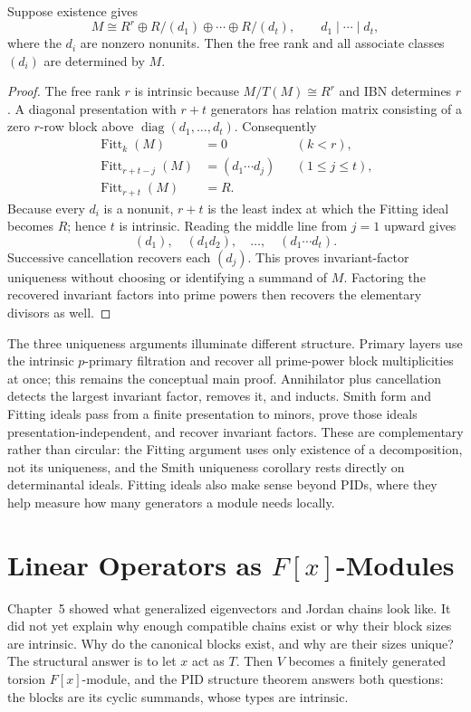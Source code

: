\begin{theorem}
\label{thm:fitting-invariant-factors}
Suppose existence gives
\[
M\cong R^r\oplus R/(d_1)\oplus\cdots\oplus R/(d_t),
\qquad d_1\mid\cdots\mid d_t,
\]
where the \(d_i\) are nonzero nonunits. Then the free rank and all associate
classes \((d_i)\) are determined by \(M\).
\end{theorem}
\begin{proof}
The free rank \(r\) is intrinsic because
\(M/T(M)\cong R^r\) and IBN determines \(r\). A diagonal presentation with
\(r+t\) generators has relation matrix consisting of a zero \(r\)-row block
above \(\operatorname{diag}(d_1,\ldots,d_t)\). Consequently
\[
\begin{aligned}
\operatorname{Fitt}_k(M)&=0 &&(k<r),\\
\operatorname{Fitt}_{r+t-j}(M)&=(d_1\cdots d_j)
&&(1\leq j\leq t),\\
\operatorname{Fitt}_{r+t}(M)&=R.
\end{aligned}
\]
Because every \(d_i\) is a nonunit, \(r+t\) is the least index at which the
Fitting ideal becomes \(R\); hence \(t\) is intrinsic. Reading the middle
line from \(j=1\) upward gives
\[
(d_1),\quad(d_1d_2),\quad\ldots,\quad(d_1\cdots d_t).
\]
Successive cancellation recovers each \((d_j)\). This proves invariant-factor
uniqueness without choosing or identifying a summand of \(M\). Factoring the
recovered invariant factors into prime powers then recovers the elementary
divisors as well.
\end{proof}

The three uniqueness arguments illuminate different structure. Primary
layers use the intrinsic \(p\)-primary filtration and recover all prime-power
block multiplicities at once; this remains the conceptual main proof.
Annihilator plus cancellation detects the largest invariant factor, removes
it, and inducts. Smith form and Fitting ideals pass from a finite presentation
to minors, prove those ideals presentation-independent, and recover invariant
factors. These are complementary rather than circular: the Fitting argument
uses only existence of a decomposition, not its uniqueness, and the Smith
uniqueness corollary rests directly on determinantal ideals. Fitting ideals
also make sense beyond PIDs, where they help measure how many generators a
module needs locally.

\section{Linear Operators as \texorpdfstring{\(F[x]\)}{F[x]}-Modules}
\label{sec:linear-operators-fx-modules}
Chapter~5 showed what generalized eigenvectors and Jordan chains look like.
It did not yet explain why enough compatible chains exist or why their block
sizes are intrinsic. Why do the canonical blocks exist, and why are their
sizes unique? The structural answer is to let \(x\) act as \(T\). Then \(V\)
becomes a finitely generated torsion \(F[x]\)-module, and the PID structure
theorem answers both questions: the blocks are its cyclic summands, whose
types are intrinsic.

